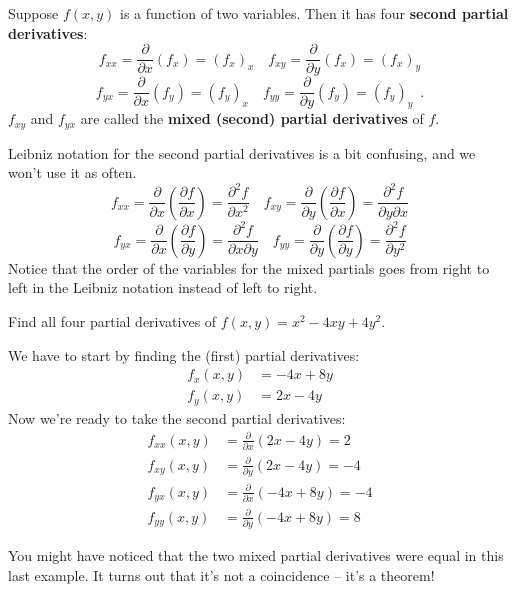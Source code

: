 \begin{definition}
Suppose $f(x,y)$ is a function of two variables. Then it has four {\bf second partial derivatives}:
$$f_{xx} = \frac{\partial}{\partial x}(f_x) = (f_x)_x \quad f_{xy} = \frac{\partial}{\partial y}(f_x)=(f_x)_y $$
$$f_{yx} = \frac{\partial}{\partial x}(f_y) = (f_y)_x \quad f_{yy} = \frac{\partial}{\partial y}(f_y)=(f_y)_y \enspace .$$
$f_{xy}$ and $f_{yx}$ are called the {\bf mixed (second) partial derivatives} of $f$.

Leibniz notation for the second partial derivatives is a bit confusing, and we won't use it as often.
$$f_{xx} = \frac{\partial}{\partial x}\left(\frac{\partial f}{\partial x}\right) = \frac{\partial^2 f}{\partial x^2} \quad
f_{xy} = \frac{\partial}{\partial y}\left(\frac{\partial f}{\partial x}\right) = \frac{\partial^2 f}{\partial y\partial x}$$
$$f_{yx} = \frac{\partial}{\partial x}\left(\frac{\partial f}{\partial y}\right) = \frac{\partial^2 f}{\partial x\partial y} \quad
f_{yy} = \frac{\partial}{\partial y}\left(\frac{\partial f}{\partial y}\right) = \frac{\partial^2 f}{\partial y^2}$$
Notice that the order of the variables for the mixed partials goes from right to left in the Leibniz notation instead of left to right.
\end{definition}
\begin{example}
Find all four partial derivatives of $f(x,y)=x^2-4xy+4y^2$.

\begin{solution}
  We have to start by finding the (first) partial derivatives:
\begin{align*}
f_x(x,y) &= -4x+8y \\
f_y(x,y) &=  2x-4y
\end{align*}
Now we're ready to take the second partial derivatives:
\begin{align*}
f_{xx}(x,y) &= \frac{\partial}{\partial x}(2x-4y) = 2 \\
f_{xy}(x,y) &= \frac{\partial}{\partial y}(2x-4y) =-4 \\
f_{yx}(x,y) &= \frac{\partial}{\partial x}(-4x+8y) =-4 \\
f_{yy}(x,y) &= \frac{\partial}{\partial y}(-4x+8y) =8
\end{align*}
\end{solution}\end{example}

You might have noticed that the two mixed partial derivatives were equal in this last example. It turns out that it's not a coincidence – it's a theorem!

